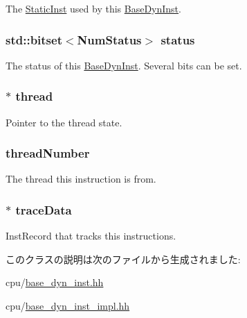 \label{classBaseDynInst_a6799d48af805bf0bd72441e882589a6a}
The \hyperlink{classStaticInst}{StaticInst} used by this \hyperlink{classBaseDynInst}{BaseDynInst}. \hypertarget{classBaseDynInst_aa3a3e4b13899ec096589e2e0c76f25bc}{
\subsubsection[{status}]{\setlength{\rightskip}{0pt plus 5cm}std::bitset$<$NumStatus$>$ {\bf status}}}
\label{classBaseDynInst_aa3a3e4b13899ec096589e2e0c76f25bc}
The status of this \hyperlink{classBaseDynInst}{BaseDynInst}. Several bits can be set. \hypertarget{classBaseDynInst_a56eb59d7a0af96e35683462934d6d13e}{
\subsubsection[{thread}]{$\ast$ {\bf thread}}}
\label{classBaseDynInst_a56eb59d7a0af96e35683462934d6d13e}
Pointer to the thread state. \hypertarget{classBaseDynInst_a892bd80aa2abe0b9cbfdf510d2111772}{
\subsubsection[{threadNumber}]{ {\bf threadNumber}}}
\label{classBaseDynInst_a892bd80aa2abe0b9cbfdf510d2111772}
The thread this instruction is from. \hypertarget{classBaseDynInst_acbcf6d90551f8d3a598a70caae74d1ef}{
\subsubsection[{traceData}]{$\ast$ {\bf traceData}}}
\label{classBaseDynInst_acbcf6d90551f8d3a598a70caae74d1ef}
InstRecord that tracks this instructions. 

このクラスの説明は次のファイルから生成されました:\begin{DoxyCompactItemize}
\item 
cpu/\hyperlink{base__dyn__inst_8hh}{base\_\-dyn\_\-inst.hh}\item 
cpu/\hyperlink{base__dyn__inst__impl_8hh}{base\_\-dyn\_\-inst\_\-impl.hh}\end{DoxyCompactItemize}
